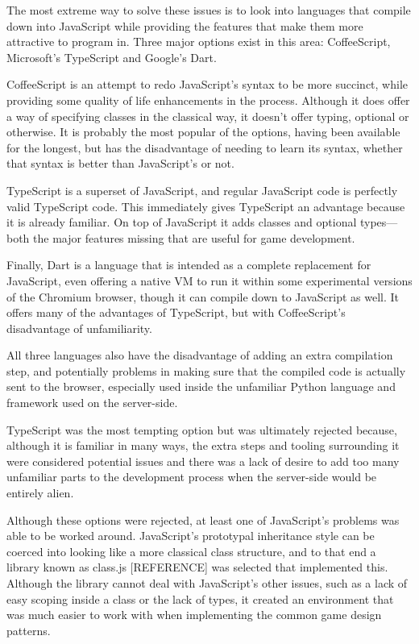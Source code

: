 The most extreme way to solve these issues is to look into languages that compile down into JavaScript while providing the features that make them more attractive to program in. Three major options exist in this area: CoffeeScript, Microsoft's TypeScript and Google's Dart.

CoffeeScript is an attempt to redo JavaScript's syntax to be more succinct, while providing some quality of life enhancements in the process. Although it does offer a way of specifying classes in the classical way, it doesn't offer typing, optional or otherwise. It is probably the most popular of the options, having been available for the longest, but has the disadvantage of needing to learn its syntax, whether that syntax is better than JavaScript's or not.

TypeScript is a superset of JavaScript, and regular JavaScript code is perfectly valid TypeScript code. This immediately gives TypeScript an advantage because it is already familiar. On top of JavaScript it adds classes and optional types---both the major features missing that are useful for game development.

Finally, Dart is a language that is intended as a complete replacement for JavaScript, even offering a native VM to run it within some experimental versions of the Chromium browser, though it can compile down to JavaScript as well. It offers many of the advantages of TypeScript, but with CoffeeScript's disadvantage of unfamiliarity.

All three languages also have the disadvantage of adding an extra compilation step, and potentially problems in making sure that the compiled code is actually sent to the browser, especially used inside the unfamiliar Python language and framework used on the server-side.

TypeScript was the most tempting option but was ultimately rejected because, although it is familiar in many ways, the extra steps and tooling surrounding it were considered potential issues and there was a lack of desire to add too many unfamiliar parts to the development process when the server-side would be entirely alien.

Although these options were rejected, at least one of JavaScript's problems was able to be worked around. JavaScript's prototypal inheritance style can be coerced into looking like a more classical class structure, and to that end a library known as class.js [REFERENCE] was selected that implemented this. Although the library cannot deal with JavaScript's other issues, such as a lack of easy scoping inside a class or the lack of types, it created an environment that was much easier to work with when implementing the common game design patterns.

